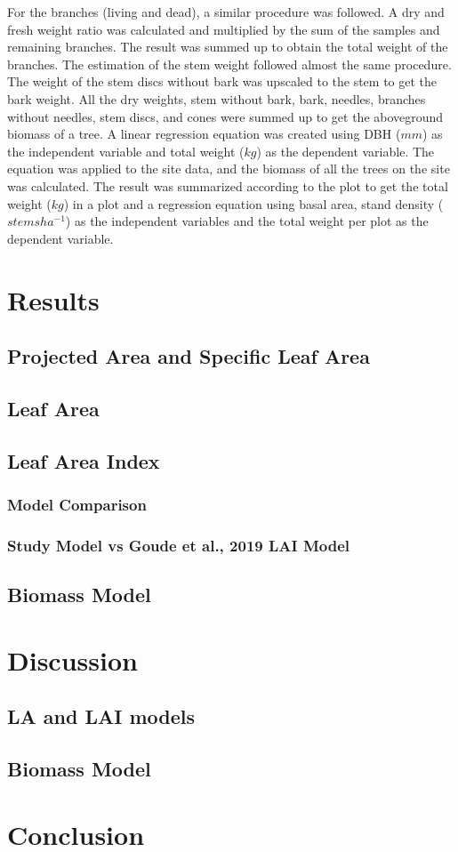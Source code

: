 \documentclass[11pt, a4paper]{report}
\begin{document}

For the branches (living and dead), a similar procedure was followed. A dry and fresh weight ratio was calculated and multiplied by the sum of the samples and remaining branches. The result was summed up to obtain the total weight of the branches. The estimation of the stem weight followed almost the same procedure. The weight of the stem discs without bark was upscaled to the stem to get the bark weight. All the dry weights, stem without bark, bark, needles, branches without needles, stem discs, and cones were summed up to get the aboveground biomass of a tree. A linear regression equation was created using DBH ($mm$) as the independent variable and total weight ($kg$) as the dependent variable. The equation was applied to the site data, and the biomass of all the trees on the site was calculated. The result was summarized according to the plot to get the total weight ($kg$) in a plot and a regression equation using basal area, stand density ($stems ha^{-1}$) as the independent variables and the total weight per plot as the dependent variable.
\chapter{Results}
\section{Projected Area and Specific Leaf Area}
\section{Leaf Area}
\section{Leaf Area Index}
\subsection{Model Comparison}
\subsection{Study Model vs Goude et al., 2019 LAI Model}
\section{Biomass Model}

\chapter{Discussion}
\section{LA and LAI models}
\section{Biomass Model}

\chapter{Conclusion}
\end{document}

